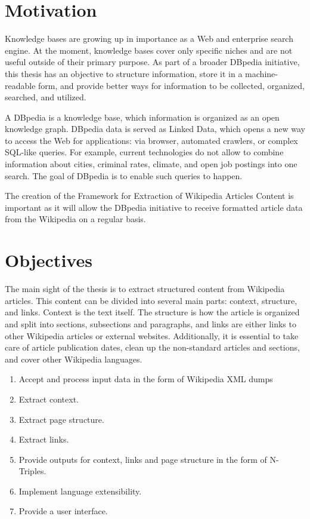 \documentclass[thesis=M,english,hidelinks]{FITthesis}[2019/12/23]
\begin{document}
\begin{introduction}
	
	\section{Motivation}

	Knowledge bases are growing up in importance as a Web and enterprise search engine. At the moment, knowledge bases cover only specific niches and are not useful outside of their primary purpose. As part of a broader DBpedia initiative, this thesis has an objective to structure information, store it in a machine-readable form, and provide better ways for information to be collected, organized, searched, and utilized.

	A DBpedia is a knowledge base, which information is organized as an open knowledge graph. DBpedia data is served as Linked Data, which opens a new way to access the Web for applications: via browser, automated crawlers, or complex SQL-like queries. For example, current technologies do not allow to combine information about cities, criminal rates, climate, and open job postings into one search. The goal of DBpedia is to enable such queries to happen.
	
	The creation of the Framework for Extraction of Wikipedia Articles Content is important as it will allow the DBpedia initiative to receive formatted article data from the Wikipedia on a regular basis. 

	\section{Objectives}

	The main sight of the thesis is to extract structured content from Wikipedia articles. This content can be divided into several main parts: context, structure, and links. Context is the text itself. The structure is how the article is organized and split into sections, subsections and paragraphs, and links are either links to other Wikipedia articles or external websites. Additionally, it is essential to take care of article publication dates, clean up the non-standard articles and sections, and cover other Wikipedia languages.
\begin{enumerate}
	\item Accept and process input data in the form of Wikipedia XML dumps
	\item Extract context.
	\item Extract page structure.
	\item Extract links.
	\item Provide outputs for context, links and page structure in the form of N-Triples.
	\item Implement language extensibility.
	\item Provide a user interface.
\end{enumerate} 


\end{introduction}
\end{document}
